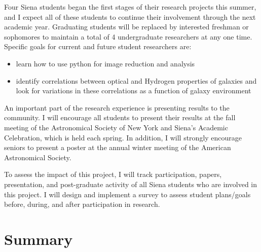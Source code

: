 \documentclass[12pt, preprint]{aastex}
\begin{document}
{Four Siena students began the first stages of their research projects this summer,
and I expect all of these students to continue their involvement through the next academic year.
Graduating students will be replaced by interested freshman or sophomores to maintain a total
of 4 undergraduate researchers at any one time.  
Specific goals for current and future student researchers are:
\vspace*{-.2cm}
\begin{itemize}
\vspace*{-.25cm}\item learn how to use python for image reduction and
analysis 
\vspace*{-.25cm}\item identify correlations between optical and Hydrogen properties of galaxies and look for variations in these correlations as a function of galaxy environment
\end{itemize}
\vspace*{-.2cm}


An important part of the research experience is presenting results
to the community.
I will encourage all students 
to present their results at the fall meeting of the 
Astronomical Society of New York and Siena's Academic Celebration, which
is held each spring.  In addition, I will strongly encourage seniors to
present a poster at the 
annual winter meeting of the American Astronomical Society.  

To assess the impact of this project, I will track participation, papers, 
presentation, and post-graduate activity of all Siena students
who are involved in this project.  I will design and implement a survey to 
assess student plans/goals before, during, and after
participation in research.

\vspace*{-.7cm}
\section{Summary}
\vspace*{-.25cm}

}
\end{document}
